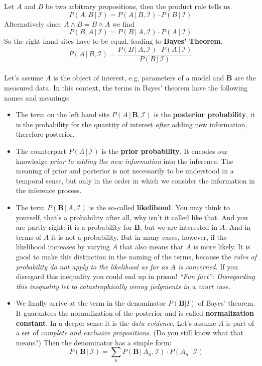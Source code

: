 \documentclass[12pt, a4paper]{scrartcl}
\begin{document}
Let $A$ and $B$ be two arbitrary propositions, then the product rule tells us. \[P(A,B\,|\,\mathcal{I})=P(A\,|\,B,\mathcal{I}) \cdot P(B\,|\,\mathcal{I})\]
Alternatively since $A\land B=B\land A$ we find \[P(B,A\,|\,\mathcal{I})=P(B\,|\,A,\mathcal{I})\cdot P(A\,|\,\mathcal{I})\]
So the right hand sites have to be equal, leading to \textbf{Bayes’ Theorem}.
\begin{equation*}\boxed{P(A\,|\,B,\mathcal{I})=\frac{P(B\,|\,A,\mathcal{I}) \cdot P(A\,|\,\mathcal{I})}{P(B\,|\,\mathcal{I})}
}\end{equation*}\\
Let’s assume $A$ is the object of interest, e.g, parameters of a model and $\boldsymbol{B}$
are the measured data. In this context, the terms in Bayes’ theorem have
the following names and meanings:
\begin{itemize}
	\item The term on the left hand site $P(A\,|\,\boldsymbol{B},\mathcal{I})$ is the \textbf{posterior probability},
	it is the probability for the quantity of interest \textit{after} adding new
	information, therefore posterior.
	\item The counterpart $P(A\,|\,\mathcal{I})$ is the \textbf{prior probability}. It encodes our
	knowledge \textit{prior to adding the new information} into the inference.
	The meaning of prior and posterior is not necessarily to be understood
	in a temporal sense, but only in the order in which we consider the
	information in the inference process.
	\item The term $P(\boldsymbol{B}\,|\,A,\mathcal{I})$
	is the so-called \textbf{likelihood}. You may think to
	yourself, that’s a probability after all, why isn’t it called like that. And you
	are partly right: it is a probability for $\boldsymbol{B}$, but we are interested in $A$.
	And in terms of $A$ it is not a probability.
	But in many cases, however, if the likelihood increases by varying $A$
	that also means that $A$ is more likely.
	It is good to make this distinction in the naming of the terms, because
	the\textit{ rules of probability do not apply to the likelihood as far as $A$ is
		concerned.} If you disregard this inequality you could end up in prison!
	\textit{``Fun fact'': Disregarding this inequality let to catastrophically wrong judgments in a court case. }%
	\item We finally arrive at the term in the denominator $P(\boldsymbol{B}|I)$ of Bayes’ theorem.
	It guarantees the normalization of the posterior and is called \textbf{normalization constant}. 
	In a deeper sense it is the \textit{data evidence}.
	Let’s assume $A$ is part of a set of \textit{complete
		and exclusive propositions}. (Do you still know what that means?) Then
	the denominator has a simple form:
	\[P(\boldsymbol{B}\,|\,\mathcal{I})=\sum_n P(\boldsymbol{B}\,|\,A_n,\mathcal{I})\cdot P(A_n\,|\,\mathcal{I})\]
\end{itemize}
\end{document}
